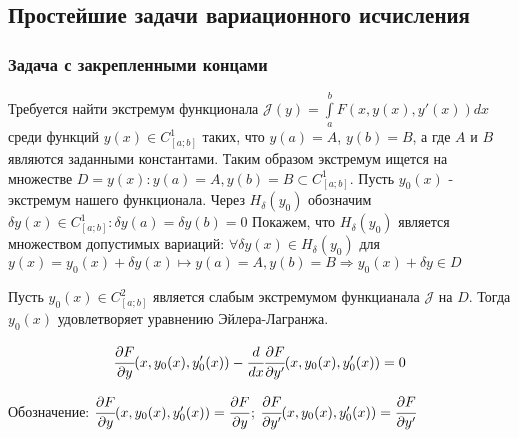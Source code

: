 \documentclass[a4paper, 12pt]{article}
\begin{document}
        \subsection{Простейшие задачи вариационного исчисления}
        \subsubsection{Задача с закрепленными концами}

        Требуется найти экстремум функционала $\mathcal{J} (y) = \int \limits^b_a F(x, y(x), y'(x)) dx$ среди функций $y(x) \in C^1_{[a;b]}$ таких, что $y(a) = A$, $y(b) = B$, а где $A$ и $B$ являются заданными константами.
        Таким образом экстремум ищется на множестве $D = {y(x): y(a) = A, y(b) = B} \subset C^1_{[a;b]}$. Пусть $y_0(x)$ - экстремум нашего функционала. 
        Через $H_{\delta}(y_0)$ обозначим ${ \delta y(x) \in C^1_{[a;b]}: \delta y(a) = \delta y(b) = 0}$ 
        Покажем, что $H_{\delta}(y_0)$ является множеством допустимых вариаций: $\forall \delta y(x) \in H_{\delta}(y_0)$ для $y(x) = y_0(x) + \delta y(x) \mapsto y(a) = A, y(b) = B \Rightarrow y_0(x) + \delta y \in D$
        
        \begin{theorem}
            Пусть $y_0(x) \in C^2_{[a;b]}$ является слабым экстремумом функцианала $\mathcal{J}$ на $D$. Тогда $y_0(x)$ удовлетворяет уравнению Эйлера-Лагранжа.
            
            \begin{equation} \label{issue15:IF}
                \cfrac{\partial F}{\partial y}(x, y_0(x), y'_0(x)) - \cfrac{d}{dx} \cfrac{\partial F}{\partial y'} (x, y_0(x), y'_0(x)) = 0
            \end{equation}

            Обозначение: $\cfrac{\partial F}{\partial y}(x, y_0(x), y'_0(x)) = \cfrac{\partial F}{\partial y}$; $\cfrac{\partial F}{\partial y'} (x, y_0(x), y'_0(x)) = \cfrac{\partial F}{\partial y'}$
    
        \end{theorem}
\end{document}
